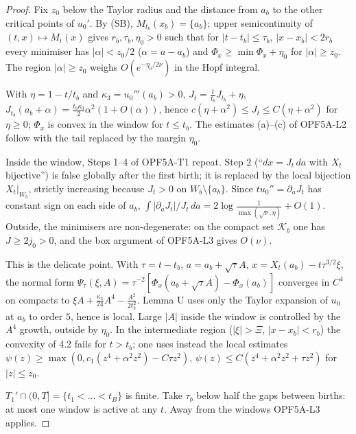\begin{proof}
Fix $z_0$ below the Taylor radius and the distance from $a_b$ to the other critical points of $u_0'$. By (SB), $M_{t_b}(x_b)=\{a_b\}$; upper semicontinuity of $(t,x)\mapsto M_t(x)$ gives $r_b,\tau_b,\eta_0>0$ such that for $|t-t_b|\le\tau_b$, $|x-x_b|<2r_b$ every minimiser has $|\alpha|<z_0/2$ ($\alpha=a-a_b$) and $\Phi_x\ge\min\Phi_x+\eta_0$ for $|\alpha|\ge z_0$. The region $|\alpha|\ge z_0$ weighs $O(e^{-\eta_0/2\nu})$ in the Hopf integral.

With $\eta=1-t/t_b$ and $\kappa_3=u_0'''(a_b)>0$, $J_t=\frac t{t_b}J_{t_b}+\eta$, $J_{t_b}(a_b+\alpha)=\frac{t_b\kappa_3}2\alpha^2(1+O(\alpha))$, hence $c(\eta+\alpha^2)\le J_t\le C(\eta+\alpha^2)$ for $\eta\ge0$; $\Phi_x$ is convex in the window for $t\le t_b$. The estimates (a)--(c) of OPF5A-L2 follow with the tail replaced by the margin $\eta_0$.

Inside the window, Steps 1--4 of OPF5A-T1 repeat. Step 2 (``$dx=J_t\,da$ with $X_t$ bijective'') is false globally after the first birth; it is replaced by the local bijection $X_t|_{W_b}$, strictly increasing because $J_t>0$ on $W_b\setminus\{a_b\}$. Since $tu_0''=\partial_aJ_t$ has constant sign on each side of $a_b$, $\int|\partial_aJ_t|/J_t\,da=2\log\frac1{\max(\sqrt\nu,\eta)}+O(1)$. Outside, the minimisers are non-degenerate: on the compact set $\mathcal K_b$ one has $J\ge2j_0>0$, and the box argument of OPF5A-L3 gives $O(\nu)$.

This is the delicate point. With $\tau=t-t_b$, $a=a_b+\sqrt\tau A$, $x=X_t(a_b)-t\tau^{3/2}\xi$, the normal form $\Psi_\tau(\xi,A)=\tau^{-2}[\Phi_x(a_b+\sqrt\tau A)-\Phi_x(a_b)]$ converges in $C^4$ on compacts to $\xi A+\frac{\kappa_3}{24}A^4-\frac{A^2}{2t_b^2}$. Lemma U uses only the Taylor expansion of $u_0$ at $a_b$ to order $5$, hence is local. Large $|A|$ inside the window is controlled by the $A^4$ growth, outside by $\eta_0$. In the intermediate region ($|\xi|>\Xi$, $|x-x_b|<r_b$) the convexity of 4.2 fails for $t>t_b$; one uses instead the local estimates $\psi(z)\ge\max(0,c_1(z^4+\alpha^2z^2)-C\tau z^2)$, $\psi(z)\le C(z^4+\alpha^2z^2+\tau z^2)$ for $|z|\le z_0$.

$T_1'\cap(0,T]=\{t_1<\dots<t_B\}$ is finite. Take $\tau_b$ below half the gaps between births: at most one window is active at any $t$. Away from the windows OPF5A-L3 applies.

\end{proof}

